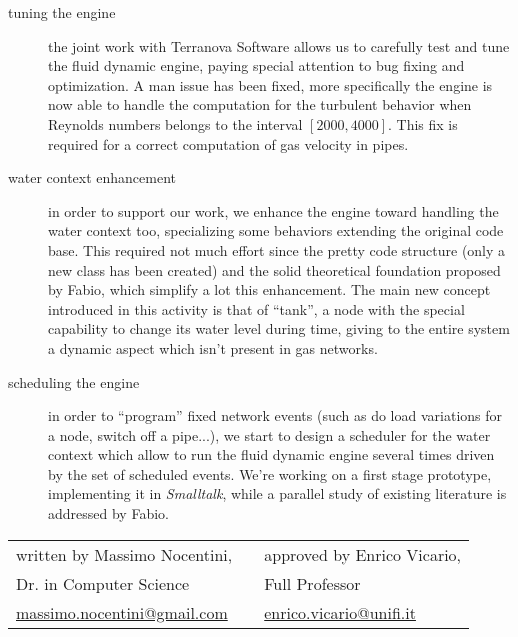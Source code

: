 \documentclass[twoside,openright,titlepage,fleqn,
headinclude,11pt,a4paper,BCOR5mm,footinclude ]{scrbook}
\begin{document}
\begin{description}
\item[tuning the engine] the joint work with Terranova Software allows
  us to carefully test and tune the fluid dynamic engine, paying
  special attention to bug fixing and optimization. A man issue has
  been fixed, more specifically the engine is now able to handle the
  computation for the turbulent behavior when Reynolds numbers belongs
  to the interval $[2000, 4000]$. This fix is required for a correct
  computation of gas velocity in pipes.
  
\item[water context enhancement] in order to support our work, we
  enhance the engine toward handling the water context too,
  specializing some behaviors extending the original code base. This
  required not much effort since the pretty code structure (only a new
  class has been created) and the solid theoretical foundation
  proposed by Fabio, which simplify a lot this enhancement.  The main
  new concept introduced in this activity is that of ``tank'', a node
  with the special capability to change its water level during time,
  giving to the entire system a dynamic aspect which isn't present in
  gas networks.
  \newpage
\item[scheduling the engine] in order to ``program'' fixed network
  events (such as do load variations for a node, switch off a
  pipe...), we start to design a scheduler for the water context which
  allow to run the fluid dynamic engine several times driven by the
  set of scheduled events. We're working on a first stage prototype,
  implementing it in \emph{Smalltalk}, while a parallel study of
  existing literature is addressed by Fabio.
  
\end{description}

\begin{tabular}{ l c l }
  written by Massimo Nocentini,  &  & approved by Enrico Vicario,  \\
  Dr. in Computer Science & & Full Professor \\
  \url{massimo.nocentini@gmail.com} &  & \url{enrico.vicario@unifi.it} \\
\end{tabular}
\end{document}
